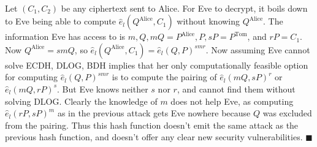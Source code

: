 \documentclass[letterpaper,12pt,oneside,onecolumn]{article}
\begin{document}
\paragraph{}
Let $(C_1, C_2)$ be any ciphertext sent to Alice. For Eve to decrypt, it boils down to Eve being able to compute $\hat{e}_l(Q^\text{Alice}, C_1)$ without knowing $Q^\text{Alice}$. The information Eve has access to is $m, Q, mQ = P^\text{Alice}, P, sP=P^\text{Tom}$, and $rP = C_1$. Now $Q^\text{Alice} = smQ$, so $\hat{e}_l(Q^\text{Alice}, C_1) = \hat{e}_l(Q, P)^{smr}$. Now assuming Eve cannot solve ECDH, DLOG, BDH implies that her only computationally feasible option for computing $\hat{e}_l(Q,P)^{smr}$ is to compute the pairing of $\hat{e}_l(mQ, sP)^r$ or $\hat{e}_l(mQ, rP)^s$. But Eve knows neither $s$ nor $r$, and cannot find them without solving DLOG. Clearly the knowledge of $m$ does not help Eve, as computing $\hat{e}_l(rP, sP)^m$ as in the previous attack gets Eve nowhere because $Q$ was excluded from the pairing. Thus this hash function doesn't emit the same attack as the previous hash function, and doesn't offer any clear new security vulnerabilities. $\blacksquare$
\end{document}
